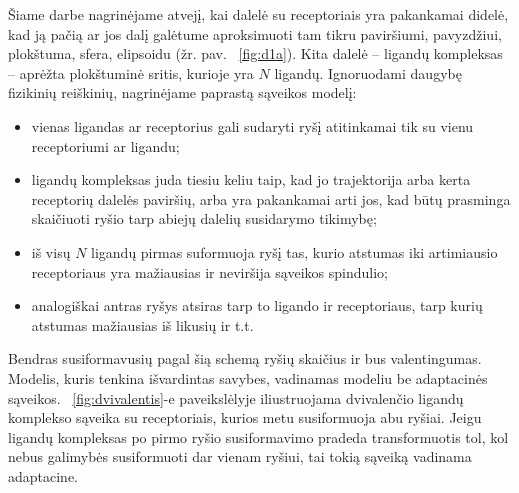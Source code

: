 \documentclass[10pt]{article}
\begin{document}


Šiame darbe  nagrinėjame atvejį, kai dalelė su receptoriais yra pakankamai didelė, kad  ją pačią  ar  jos dalį   galėtume aproksimuoti tam tikru paviršiumi, pavyzdžiui,  plokštuma, sfera, elipsoidu (žr. pav. ~\ref{fig:d1a}).  Kita dalelė – ligandų kompleksas –  aprėžta plokštuminė sritis, kurioje yra $ N $  ligandų. Ignoruodami daugybę fizikinių  reiškinių, nagrinėjame paprastą  sąveikos  modelį: 
\begin{itemize}

\item vienas ligandas ar receptorius gali sudaryti ryšį atitinkamai tik su vienu receptoriumi ar ligandu;

\item   ligandų kompleksas juda tiesiu keliu taip, kad jo trajektorija arba kerta receptorių dalelės paviršių, arba yra pakankamai arti jos, kad būtų prasminga skaičiuoti  ryšio tarp abiejų dalelių susidarymo tikimybę;

\item iš visų $N$ ligandų pirmas suformuoja ryšį tas, kurio atstumas iki artimiausio receptoriaus yra  mažiausias ir neviršija sąveikos spindulio;

\item  analogiškai antras ryšys atsiras tarp to ligando ir receptoriaus, tarp kurių atstumas mažiausias iš likusių ir t.t.  
\end{itemize}
               
           
Bendras susiformavusių pagal šią schemą ryšių skaičius  ir bus valentingumas. Modelis, kuris tenkina išvardintas savybes, vadinamas modeliu  be adaptacinės sąveikos. ~\ref{fig:dvivalentis}-e paveikslėlyje  iliustruojama dvivalenčio ligandų komplekso sąveika su receptoriais, kurios metu susiformuoja  abu ryšiai. Jeigu ligandų kompleksas po pirmo ryšio susiformavimo pradeda transformuotis tol, kol nebus galimybės susiformuoti dar vienam ryšiui, tai tokią sąveiką vadinama  adaptacine.  
          
\end{document}
